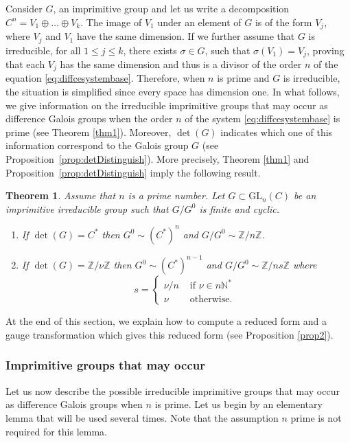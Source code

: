 \documentclass[a4paper,11pt]{amsart}
\renewcommand{\leq}{\leqslant}
\newtheorem{thm}{Theorem}[section]
\def\Z{\mathbb{Z}}
\def\N{\mathbb{N}}
\begin{document}
Consider $G$, an imprimitive group and let us write a decomposition   $C^n =V_1 \oplus \dots \oplus V_k$.  The image of $V_1$ under  an element of $G$ is of the form $V_j$,  where $V_j$ and $V_1$ have the same dimension. If we further assume that $G$ is irreducible, for all $1\leq j \leq k$, there exists $\sigma\in G$, such that  $\sigma (V_1)=V_j$, proving that each $V_j$ has the same dimension and thus is a divisor of the order $n$ of the equation \eqref{eq:diffcesystembase}.   Therefore,  when $n$ is prime and $G$ is irreducible,  the situation is simplified since every space has dimension one. 
In what follows, we  give information on the irreducible imprimitive groups that may occur as difference Galois groups when the order $n$ of the system \eqref{eq:diffcesystembase} is prime (see Theorem \ref{thm1}). Moreover, $\det(G)$ indicates which one of this information correspond to the Galois group $G$  (see Proposition~\ref{prop:detDistinguish}). More precisely, Theorem \ref{thm1} and Proposition~\ref{prop:detDistinguish} imply the following result.

\begin{thm}\label{thmimpr}
Assume that $n$ is a prime number.  Let $G \subset \mathrm{GL}_n (C)$ be an imprimitive irreducible group such that $G/G^{0}$ is finite and cyclic. 
\begin{enumerate}
 \item If $\det(G) = C^*$ then $G^0\sim (C^*)^n$ and  
$G/G^0 \sim  \Z/ n \Z$.
 \item If $\det(G)=\Z/  \nu \Z$ then ${G^0\sim (C^*)^{n-1}}$ and
$G/G^0 \sim  \Z/ ns \Z$  where
 $$s = \left\lbrace \begin{array}{ll}
      \nu/n & \text{ if }  \nu \in n\N^* \\
     \nu & \text{ otherwise. }
 \end{array}\right.$$
\end{enumerate}
\end{thm}

At the end of this section, we explain how to compute a reduced form and a gauge transformation which gives this reduced form (see Proposition \ref{prop2}). \par 

\subsubsection{Imprimitive groups that may occur}
 
 Let us now describe the possible irreducible imprimitive groups that may occur as difference Galois groups when $n$ is prime.  Let us begin by an elementary lemma that will be used several times. Note that the assumption $n$ prime is not required for this lemma.
 
\end{document}
